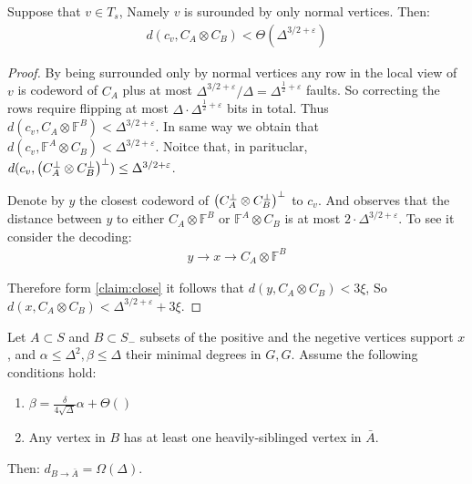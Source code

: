 \begin{claim}
  \label{claim:closeto}
  Suppose that $v \in T_{s}$, Namely $v$ is surounded by only normal vertices. Then:
  \begin{equation*}
    \begin{split}
      d\left( c_{v}, C_{A}\otimes C_{B}\right) < \Theta\left( \Delta^{3/2+\varepsilon} \right)
    \end{split}
  \end{equation*} 
 \end{claim}
\begin{proof}
  By being surrounded only by normal vertices any row in the local view of $v$ is codeword of $C_{A}$ plus at most $\Delta^{3/2 + \varepsilon}/\Delta = \Delta^{\frac{1}{2}+\varepsilon}$ faults. So correcting the rows require flipping at most $\Delta \cdot \Delta^{\frac{1}{2} + \varepsilon}$ bits in total.  Thus $d\left(c_{v}, C_{A}\otimes \mathbb{F}^{B}\right) < \Delta^{3/2 + \varepsilon}$. In same way we obtain that $d\left(c_{v},  \mathbb{F}^{A} \otimes C_{B}\right) < \Delta^{3/2 + \varepsilon}$. Noitce that, in parituclar, $d(c_{v}, \left( C_{A}^{\perp}\otimes C_{B}^{\perp} \right)^{\perp}) \le \Delta^{3/2 + \varepsilon}$.

  Denote by $y$ the closest codeword of $\left( C_{A}^{\perp}\otimes C_{B}^{\perp} \right)^{\perp}$ to $c_{v}$. And observes that the distance between $y$ to either $C_{A} \otimes \mathbb{F}^{B}$ or $\mathbb{F}^{A}\otimes C_{B}$ is at most $2 \cdot \Delta^{3/2 + \varepsilon}$. To see it consider the decoding: 
  \begin{equation*}
    \begin{split}
  y \rightarrow x \rightarrow C_{A} \otimes \mathbb{F}^{B}   
    \end{split}
  \end{equation*}
  
  Therefore form \cref{claim:close} it follows that $d\left(y, C_{A} \otimes C_{B}\right) < 3 \xi $, So $d\left(x, C_{A} \otimes C_{B}\right) < \Delta^{3/2 + \varepsilon} +  3 \xi $.
     \end{proof}
   
   
 
 \begin{claim}  
   \label{cliam:tech} Let $A \subset S$ and $B \subset S_{-}$ subsets of the positive and the negetive vertices support $x$, and $\alpha \le \Delta^{2},\beta \le \Delta$ their minimal degrees in $G, G$. Assume the following conditions hold:
   \begin{enumerate}
     \item $\beta = \frac{\delta}{4 \sqrt{\Delta}}\alpha + \Theta\left(  \right)$
     \item Any vertex in $B$ has at least one heavily-siblinged vertex in $\bar{A}$.
   \end{enumerate}
   Then: $d_{B\rightarrow \bar{A}} = \Omega\left( \Delta \right)$.  
 \end{claim}

